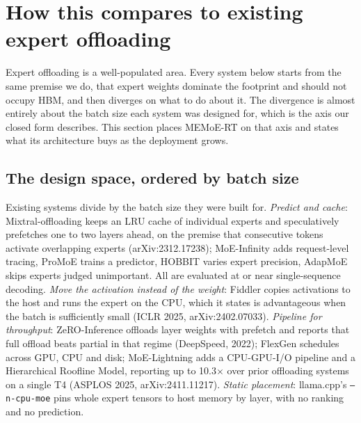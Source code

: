 \documentclass[10pt,a4paper]{article}
\begin{document}

\section{How this compares to existing expert offloading}

Expert offloading is a well-populated area. Every system below starts from the
same premise we do, that expert weights dominate the footprint and should not
occupy HBM, and then diverges on what to do about it. The divergence is almost
entirely about the batch size each system was designed for, which is the axis our
closed form describes. This section places MEMoE-RT on that axis and states what
its architecture buys as the deployment grows.

\subsection{The design space, ordered by batch size}

Existing systems divide by the batch size they were built for. \emph{Predict and
cache}: Mixtral-offloading keeps an LRU cache of individual experts and
speculatively prefetches one to two layers ahead, on the premise that consecutive
tokens activate overlapping experts (arXiv:2312.17238); MoE-Infinity adds
request-level tracing, ProMoE trains a predictor, HOBBIT varies expert precision,
AdapMoE skips experts judged unimportant. All are evaluated at or near
single-sequence decoding. \emph{Move the activation instead of the weight}:
Fiddler copies activations to the host and runs the expert on the CPU, which it
states is advantageous when the batch is sufficiently small (ICLR 2025,
arXiv:2402.07033). \emph{Pipeline for throughput}: ZeRO-Inference offloads layer
weights with prefetch and reports that full offload beats partial in that regime
(DeepSpeed, 2022); FlexGen schedules across GPU, CPU and disk; MoE-Lightning adds
a CPU-GPU-I/O pipeline and a Hierarchical Roofline Model, reporting up to
10.3$\times$ over prior offloading systems on a single T4 (ASPLOS 2025,
arXiv:2411.11217). \emph{Static placement}: llama.cpp's \texttt{--n-cpu-moe}
pins whole expert tensors to host memory by layer, with no ranking and no
prediction.
\end{document}
